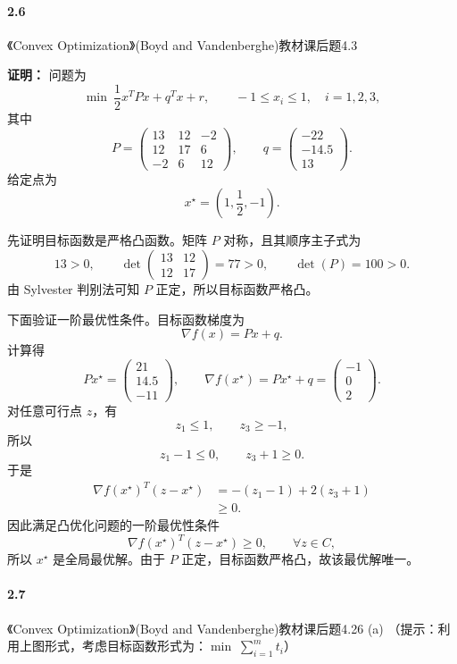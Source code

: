 \documentclass[12pt,a4paper]{article}
\begin{document}
\paragraph{2.6} 《Convex Optimization》(Boyd and Vandenberghe)教材课后题4.3

\textbf{证明：}
问题为
\[
  \min\ \frac12 x^TPx+q^Tx+r,
  \qquad -1\leq x_i\leq 1,\quad i=1,2,3,
\]
其中
\[
  P=
  \begin{pmatrix}
    13 & 12 & -2\\
    12 & 17 & 6\\
    -2 & 6 & 12
  \end{pmatrix},
  \qquad
  q=
  \begin{pmatrix}
    -22\\ -14.5\\ 13
  \end{pmatrix}.
\]
给定点为
\[
  x^\star=\left(1,\frac12,-1\right).
\]

先证明目标函数是严格凸函数。矩阵 $P$ 对称，且其顺序主子式为
\[
  13>0,\qquad
  \det\begin{pmatrix}13&12\\12&17\end{pmatrix}=77>0,\qquad
  \det(P)=100>0.
\]
由 Sylvester 判别法可知 $P$ 正定，所以目标函数严格凸。

下面验证一阶最优性条件。目标函数梯度为
\[
  \nabla f(x)=Px+q.
\]
计算得
\[
  Px^\star=
  \begin{pmatrix}
    21\\ 14.5\\ -11
  \end{pmatrix},
  \qquad
  \nabla f(x^\star)=Px^\star+q=
  \begin{pmatrix}
    -1\\ 0\\ 2
  \end{pmatrix}.
\]
对任意可行点 $z$，有
\[
  z_1\leq 1,\qquad z_3\geq -1,
\]
所以
\[
  z_1-1\leq 0,\qquad z_3+1\geq 0.
\]
于是
\[
\begin{aligned}
  \nabla f(x^\star)^T(z-x^\star)
  &=-(z_1-1)+2(z_3+1)\\
  &\geq 0.
\end{aligned}
\]
因此满足凸优化问题的一阶最优性条件
\[
  \nabla f(x^\star)^T(z-x^\star)\geq 0,\qquad \forall z\in C,
\]
所以 $x^\star$ 是全局最优解。由于 $P$ 正定，目标函数严格凸，故该最优解唯一。

\paragraph{2.7} 《Convex Optimization》(Boyd and Vandenberghe)教材课后题4.26 (a) （提示：利用上图形式，考虑目标函数形式为：$\min \; \sum_{i=1}^m t_i$）
\end{document}
